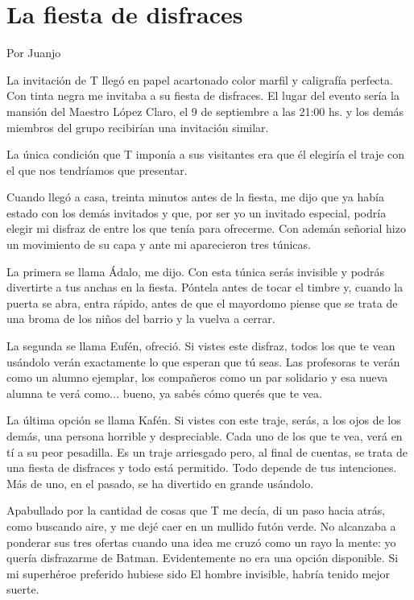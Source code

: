 \documentclass[11pt,twoside,openright,a5paper]{book}
\begin{document}
\section*{La fiesta de disfraces}
                                                                                    \begin{flushright}Por Juanjo\end{flushright}

La invitación de T llegó en papel acartonado color marfil y caligrafía perfecta. Con tinta negra me invitaba a su fiesta de disfraces. El lugar del evento sería la mansión del Maestro López Claro, el 9 de septiembre a las 21:00 hs. y los demás miembros del grupo recibirían una invitación similar.

La única condición que T imponía a sus visitantes era que él elegiría el traje con el que nos tendríamos que presentar.

Cuando llegó a casa, treinta minutos antes de la fiesta, me dijo que ya había estado con los demás invitados y que, por ser yo un invitado especial, podría elegir mi disfraz de entre los que tenía para ofrecerme. Con ademán señorial hizo un movimiento de su capa y ante mi aparecieron tres túnicas.

La primera se llama Ádalo, me dijo. Con esta túnica serás invisible y podrás divertirte a tus anchas en la fiesta. Póntela antes de tocar el timbre y, cuando la puerta se abra, entra rápido, antes de que el mayordomo piense que se trata de una broma de los niños del barrio y la vuelva a cerrar.

La segunda se llama Eufén, ofreció. Si vistes este disfraz, todos los que te vean usándolo verán exactamente lo que esperan que tú seas. Las profesoras te verán como un alumno ejemplar, los compañeros como un par solidario y esa nueva alumna te verá como... bueno, ya sabés cómo querés que te vea.

La última opción se llama Kafén. Si vistes con este traje, serás, a los ojos de los demás, una persona horrible y despreciable. Cada uno de los que te vea, verá en tí a su peor pesadilla. Es un traje arriesgado pero, al final de cuentas, se trata de una fiesta de disfraces y todo está permitido. Todo depende de tus intenciones. Más de uno, en el pasado, se ha divertido en grande usándolo.

Apabullado por la cantidad de cosas que T me decía, di un paso hacia atrás, como buscando aire, y me dejé caer en un mullido futón verde. No alcanzaba a ponderar sus tres ofertas cuando una idea me cruzó como un rayo la mente: yo quería disfrazarme de Batman. Evidentemente no era una opción disponible. Si mi superhéroe preferido hubiese sido El hombre invisible, habría tenido mejor suerte.
\end{document}
